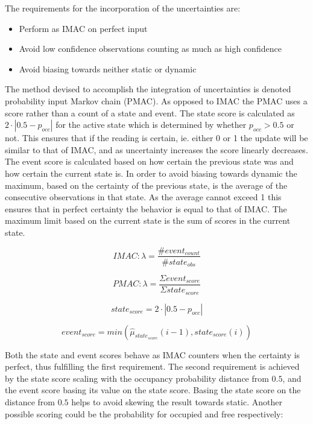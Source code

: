 The requirements for the incorporation of the uncertainties are:
\begin{itemize}
	\item Perform as IMAC on perfect input
	\item Avoid low confidence observations counting as much as high confidence
	\item Avoid biasing towards neither static or dynamic
\end{itemize}

The method devised to accomplish the integration of uncertainties is denoted probability input Markov chain (PMAC). As opposed to IMAC the PMAC uses a score rather than a count of a state and event. The state score is calculated as  \(2\cdot|0.5-p_{occ}|\) for the active state which is determined by whether \(p_{occ} > 0.5\) or not. This ensures that if the reading is certain, ie. either 0 or 1 the update will be similar to that of IMAC, and as uncertainty increases the score linearly decreases. The event score is calculated based on how certain the previous state was and how certain the current state is. In order to avoid biasing towards dynamic the maximum, based on the certainty of the previous state, is the average of the consecutive observations in that state. As the average cannot exceed 1 this ensures that in perfect certainty the behavior is equal to that of IMAC. The maximum limit based on the current state is the sum of scores in the current state.

\begin{equation}
IMAC: \lambda = \frac{\#event_{count}}{\#state_{obs}}
\end{equation}

\begin{equation}
PMAC: \lambda = \frac{\Sigma event_{score}}{\Sigma state_{score}}
\label{eq:pmac_lambda}
\end{equation}

\begin{equation}
state_{score}=2 \cdot |0.5-p_{occ}| 
\end{equation}

\begin{equation}
event_{score}=min(\hat{\mu}_{state_{score}}(i-1),state_{score}(i))
\end{equation}

Both the state and event scores behave as IMAC counters when the certainty is perfect, thus fulfilling the first requirement. The second requirement is achieved by the state score scaling with the occupancy probability distance from $0.5$, and the event score basing its value on the state score. Basing the state score on the distance from $0.5$ helps to avoid skewing the result towards static. Another possible scoring could be the probability for occupied and free respectively: 

